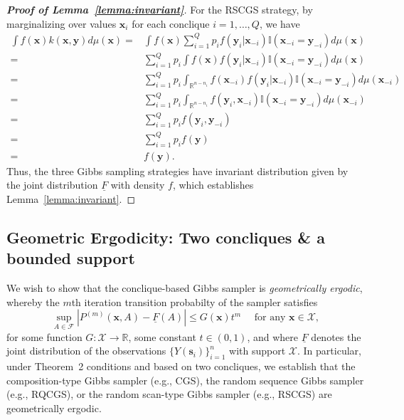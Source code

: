 \documentclass[12pt]{article}
\theoremstyle{definition}
\begin{document}
\begin{proof}[\bf Proof of Lemma~\ref{lemma:invariant}]
For the RSCGS strategy, by marginalizing over values $\boldsymbol x_i$ for each conclique $i = 1, \dots, Q$, we have
\begin{align*}
 \int f(\boldsymbol x) k(\boldsymbol x, \boldsymbol y) d\mu(\boldsymbol x)
 =& \int   f(\boldsymbol x)  \sum\limits_{i = 1}^Q p_i  f(\boldsymbol y_i|\boldsymbol x_{-i}) \mathbb{I}(\boldsymbol x_{-i} = \boldsymbol y_{-i})d\mu(\boldsymbol x) \\
 =&\sum\limits_{i = 1}^Q p_i   \int   f(\boldsymbol x)  f(\boldsymbol y_i|\boldsymbol x_{-i}) \mathbb{I}(\boldsymbol x_{-i} = \boldsymbol y_{-i})d\mu(\boldsymbol x) \\
 =&\sum\limits_{i = 1}^Q p_i   \int_{\mathbb{R}^{n-n_i}}   f(\boldsymbol x_{-i})  f(\boldsymbol y_i|\boldsymbol x_{-i}) \mathbb{I}(\boldsymbol x_{-i} = \boldsymbol y_{-i})d\mu(\boldsymbol x_{-i}) \\
 =&\sum\limits_{i = 1}^Q p_i  \int_{\mathbb{R}^{n-n_i}}    f(\boldsymbol y_i,\boldsymbol x_{-i}) \mathbb{I}(\boldsymbol x_{-i} = \boldsymbol y_{-i})d\mu(\boldsymbol x_{-i}) \\
 =&\sum\limits_{i = 1}^Q p_i     f(\boldsymbol y_i,\boldsymbol y_{-i}) \\
 =&\sum\limits_{i = 1}^{Q} p_i   f(\boldsymbol y)\\
 =& f(\boldsymbol y).
\end{align*}
Thus, the three Gibbs sampling strategies have invariant distribution given by the joint distribution $\underline{F}$ with density  $ f$, which establishes Lemma~\ref{lemma:invariant}.
\end{proof}


\subsection{Geometric Ergodicity: Two concliques \& a bounded support}

We wish to show that the conclique-based Gibbs sampler is \emph{geometrically ergodic}, whereby  the $m$th iteration transition probabilty of the sampler satisfies
$$
\sup_{A\in\mathcal{F}}|P^{(m)}(\boldsymbol x, A) - \underline{F}(A) | \le G(\boldsymbol x)t^m \quad \text{ for any } \boldsymbol x \in \mathcal{X},
$$for some function $G: \mathcal{X} \rightarrow \mathbb{R}$, some constant $t \in (0,1)$, and where $\underline{F}$ denotes the   joint distribution of
the observations $\{Y(\boldsymbol s_i)\}_{i=1}^n$ with support   $\mathcal{X}$.  In particular,  under Theorem~2 conditions and based on two concliques, we establish  that the composition-type Gibbs sampler (e.g., CGS), the random sequence
Gibbs sampler (e.g., RQCGS), or the random scan-type Gibbs sampler (e.g., RSCGS) are geometrically ergodic.
\end{document}

